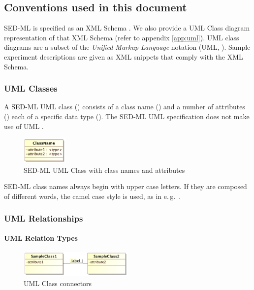 \subsection{Conventions used in this document}
\label{sec:conventions}

SED-ML is specified as an XML Schema \citep{xmls}. We also provide a UML Class diagram representation of that XML Schema (refer to appendix \ref{app:uml}). UML class diagrams are a subset of the \emph{Unified Markup Language} notation (UML, \citep{uml22}). Sample experiment descriptions are given as XML snippets that comply with the XML Schema.

\subsubsection{UML Classes}
\label{sec:umlconventions}
A SED-ML UML class () consists of a class name () and a number of attributes () each of a specific data type (). The SED-ML UML specification does not make use of UML .
\begin{figure}[h]
\centering
\includegraphics[width=0.2\textwidth]{images/uml/umlClass.png}
\caption{SED-ML UML Class with class names and attributes}
\label{fig:umlClass}
\end{figure}

SED-ML class names always begin with upper case letters. If they are composed of different words, the camel case style is used, as in e.\,g.\ .

\subsubsection{UML Relationships}
\paragraph{UML Relation Types}
\begin{figure}[h]
\centering
\includegraphics[width=0.5\textwidth]{images/uml/classRelation.png}
\caption{UML Class connectors}
\label{fig:umlConnectors}
\end{figure}

